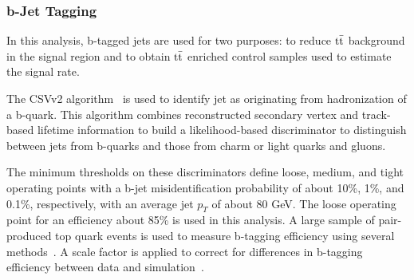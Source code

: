 \subsubsection{b-Jet Tagging}

In this analysis, b-tagged jets are used for two purposes: to reduce $\rm{t\bar{t}}$ background in the signal region and to obtain $\rm{t\bar{t}}$ enriched 
control samples used to estimate the signal rate.

The CSVv2 algorithm~\cite{Chatrchyan:2012jua} is used to identify jet as originating from hadronization of a b-quark. This algorithm combines 
reconstructed secondary vertex and track-based lifetime information to build a likelihood-based discriminator to distinguish between jets from b-quarks and those 
from charm or light quarks and gluons.

The minimum thresholds on these discriminators define loose, medium, and tight operating points with a b-jet misidentification probability of about 10\%, 1\%, and 
0.1\%, respectively, with an average jet $p_T$ of about 80 GeV. The loose operating point for an efficiency about 85\% is used in this analysis.
A large sample of pair-produced top quark events is used to measure b-tagging efficiency using several methods~\cite{CMS-PAS-BTV-13-001}. A scale factor is 
applied to correct for differences in b-tagging efficiency between data and simulation~\cite{bTagging}.
